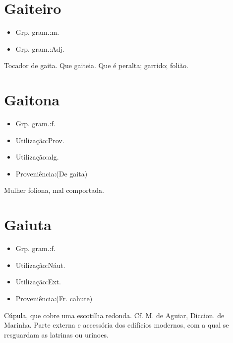 \section{Gaiteiro}
\begin{itemize}
\item {Grp. gram.:m.}
\end{itemize}
\begin{itemize}
\item {Grp. gram.:Adj.}
\end{itemize}
Tocador de gaita.
Que gaiteia.
Que é peralta; garrido; folião.
\section{Gaitona}
\begin{itemize}
\item {Grp. gram.:f.}
\end{itemize}
\begin{itemize}
\item {Utilização:Prov.}
\end{itemize}
\begin{itemize}
\item {Utilização:alg.}
\end{itemize}
\begin{itemize}
\item {Proveniência:(De \textunderscore gaita\textunderscore )}
\end{itemize}
Mulher foliona, mal comportada.
\section{Gaiuta}
\begin{itemize}
\item {Grp. gram.:f.}
\end{itemize}
\begin{itemize}
\item {Utilização:Náut.}
\end{itemize}
\begin{itemize}
\item {Utilização:Ext.}
\end{itemize}
\begin{itemize}
\item {Proveniência:(Fr. \textunderscore cahute\textunderscore )}
\end{itemize}
Cúpula, que cobre uma escotilha redonda. Cf. M. de Aguiar, \textunderscore Diccion. de Marinha\textunderscore .
Parte externa e accessória dos edifícios modernos, com a qual se resguardam as latrinas ou urinoes.
